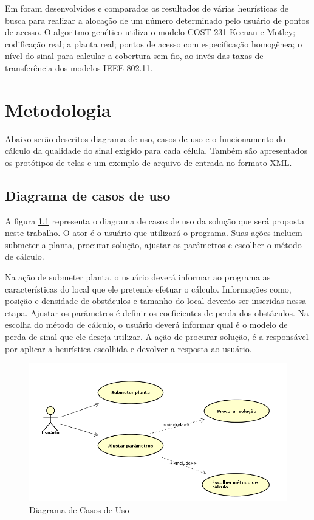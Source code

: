 \documentclass[tc,twoside]{iiufrgs}
\begin{document}
Em \cite{nagy2012global} foram desenvolvidos e comparados os resultados de várias heurísticas de busca para realizar a alocação de um número determinado pelo usuário de pontos de acesso. O algoritmo genético utiliza o modelo COST 231 Keenan e Motley; codificação real; a planta real; pontos de acesso com especificação homogênea; o nível do sinal para calcular a cobertura sem fio, ao invés das taxas de transferência dos modelos IEEE 802.11.

\chapter{Metodologia} 

Abaixo serão descritos diagrama de uso, casos de uso e o funcionamento do cálculo da qualidade do sinal exigido para cada célula. Também são apresentados os protótipos de telas e um exemplo de arquivo de entrada no formato XML.

\section{Diagrama de casos de uso} 

A figura \ref{fig:casosDeUso} representa o diagrama de casos de uso da solução que será proposta neste trabalho. O ator é o usuário que utilizará o programa. Suas ações incluem submeter a planta, procurar solução, ajustar os parâmetros e escolher o método de cálculo.

Na ação de submeter planta, o usuário deverá informar ao programa as características do local que ele pretende efetuar o cálculo. Informações como, posição e densidade de obstáculos e tamanho do local deverão ser inseridas nessa etapa. Ajustar os parâmetros é definir os coeficientes de perda dos obstáculos. Na escolha do método de cálculo, o usuário deverá informar qual é o modelo de perda de sinal que ele deseja utilizar. A ação de procurar solução, é a responsável por aplicar a heurística escolhida e devolver a resposta ao usuário.

\begin{figure}[h]
\centering
\includegraphics[scale=0.55]{img/casosDeUso.png}
\caption{Diagrama de Casos de Uso}
\label{fig:casosDeUso}
\end{figure}
\end{document}

